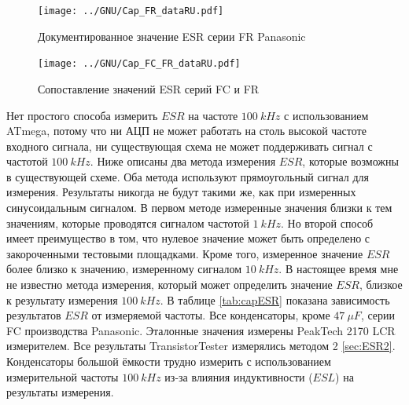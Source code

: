 \begin{figure}[H]
  \centering
    \texttt{[image: ../GNU/Cap\_FR\_dataRU.pdf]}
  \caption{Документированное значение ESR серии FR Panasonic}
  \label{fig:Cap_FR_data}
\end{figure}

\begin{figure}[H]
  \centering
    \texttt{[image: ../GNU/Cap\_FC\_FR\_dataRU.pdf]}
  \caption{Сопоставление значений ESR серий FC и FR}
  \label{fig:Cap_FC_FR_data}
\end{figure}

Нет простого способа измерить \(ESR\) на частоте \(100~kHz\) с использованием ATmega,
потому что ни АЦП не может работать на столь высокой частоте входного сигнала, ни существующая схема
не может поддерживать сигнал с частотой \(100~kHz\).
Ниже описаны два метода измерения \(ESR\), которые возможны в существующей схеме.
Оба метода используют прямоугольный сигнал для измерения. Результаты никогда не будут такими же, как 
при измеренных синусоидальным сигналом.
В первом методе измеренные значения близки к тем значениям, которые проводятся сигналом частотой \(1~kHz\).
Но второй способ имеет преимущество в том, что нулевое значение может быть определено с закороченными 
тестовыми площадками.
Кроме того, измеренное значение \(ESR\) более близко к значению, измеренному сигналом \(10~kHz\).
В настоящее время мне не известно метода измерения, который может определить значение \(ESR\), близкое к 
результату измерения \(100~kHz\).
В таблице \ref{tab:capESR} показана зависимость результатов \(ESR\) от измеряемой частоты.
Все конденсаторы, кроме \(47~\mu F\), серии FC производства Panasonic.
Эталонные значения измерены PeakTech 2170 LCR измерителем.
Все результаты TransistorTester измерялись методом 2 \ref{sec:ESR2}.
Конденсаторы большой ёмкости трудно измерить с использованием измерительной частоты \(100~kHz\)
из-за влияния индуктивности (\(ESL\)) на результаты измерения.

